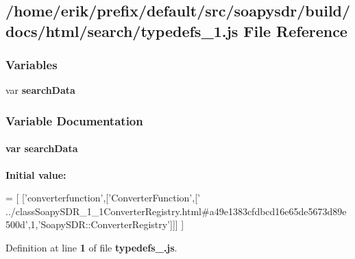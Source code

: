\subsection{/home/erik/prefix/default/src/soapysdr/build/docs/html/search/typedefs\+\_\+1.js File Reference}
\label{typedefs__1_8js}
\subsubsection*{Variables}
\begin{DoxyCompactItemize}
\item 
var {\bf search\+Data}
\end{DoxyCompactItemize}


\subsubsection{Variable Documentation}
\paragraph[{search\+Data}]{\setlength{\rightskip}{0pt plus 5cm}var search\+Data}\label{typedefs__1_8js_ad01a7523f103d6242ef9b0451861231e}
{\bfseries Initial value\+:}
\begin{DoxyCode}
=
[
  [\textcolor{stringliteral}{'converterfunction'},[\textcolor{stringliteral}{'ConverterFunction'},[\textcolor{stringliteral}{'
      ../classSoapySDR\_1\_1ConverterRegistry.html#a49e1383cfdbcd16e65de5673d89e500d'},1,\textcolor{stringliteral}{'SoapySDR::ConverterRegistry'}]]]
]
\end{DoxyCode}


Definition at line {\bf 1} of file {\bf typedefs\+\_.\+js}.

